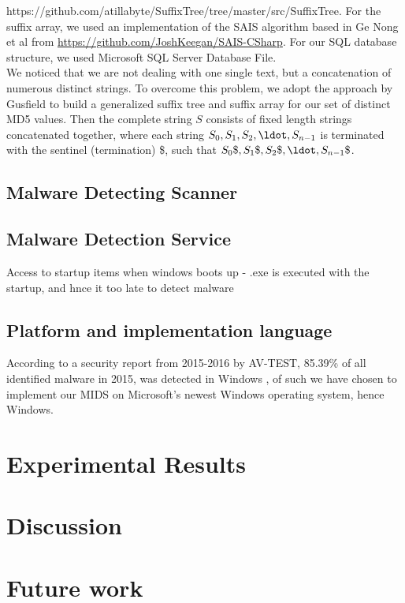 \documentclass[12pt]{article} %
\begin{document}
{https://github.com/atillabyte/SuffixTree/tree/master/src/SuffixTree}. For the suffix array, we used an implementation of the SAIS algorithm based in Ge Nong et al \cite{twoeffecient} from \href{https://github.com/JoshKeegan/SAIS-CSharp}{https://github.com/JoshKeegan/SAIS-CSharp}. For our SQL database structure, we used Microsoft SQL Server Database File. \\
We noticed that we are not dealing with one single text, but a concatenation of numerous distinct strings. To overcome this problem, we adopt the approach by Gusfield \cite{twoeffecient} to build a generalized suffix tree and suffix array for our set of distinct MD5 values. Then the complete string $S$ consists of fixed length strings concatenated together, where each string $S_0, S_1, S_2, \ldot, S_{n-1}$ is terminated with the sentinel (termination) \$, such that $S_0\$, S_1\$, S_2\$, \ldot, S_{n-1}\$$.


\subsection{Malware Detecting Scanner}


\subsection{Malware Detection Service}
Access to startup items when windows boots up - .exe is executed with the startup, and hnce it too late to detect malware

\subsection{Platform and implementation language}
According to a security report from 2015-2016 by AV-TEST, 85.39\% of all identified malware in 2015, was detected in Windows\® \cite{avtestreport }, of such we have chosen to implement our MIDS on Microsoft’s newest Windows \® operating system, hence Windows.  

\section{Experimental Results}

\section{Discussion}

\section{Future work}
\end{document}
